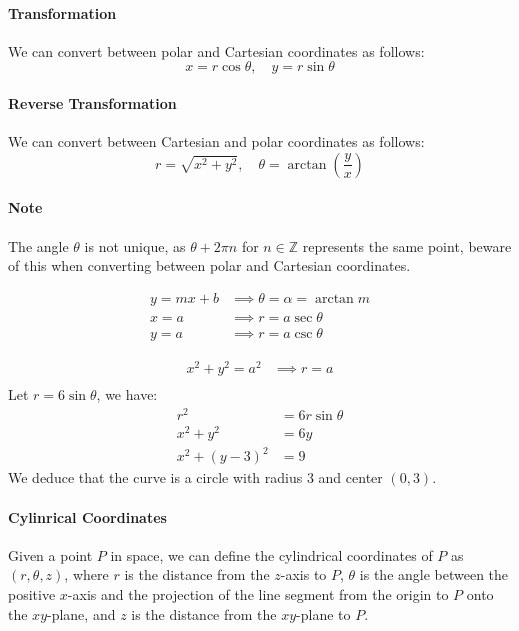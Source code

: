 \documentclass[11pt]{report}
\begin{document}
\paragraph{Transformation} We can convert between polar and Cartesian coordinates as follows:
\begin{equation}
    x = r\cos \theta, \quad y = r\sin \theta
\end{equation}
\paragraph{Reverse Transformation} We can convert between Cartesian and polar coordinates as follows:
\begin{equation}
    r = \sqrt{x^2 + y^2}, \quad \theta = \arctan\left(\frac{y}{x}\right)
\end{equation}
\paragraph{Note} The angle $\theta$ is not unique, as $\theta + 2\pi n$ for $n \in \mathbb{Z}$ represents the same point, beware of this when converting between polar and Cartesian coordinates.
\begin{example}[Lines]
    \begin{align*}
        y = mx + b &\implies \theta = \alpha = \arctan m \\
        x = a &\implies r = a\sec \theta \\
        y = a &\implies r = a\csc \theta
    \end{align*}
\end{example}
\begin{example}[Cirlces]
    \begin{align*}
        x^2 + y^2 = a^2 &\implies r = a \\
    \end{align*}
    Let $r = 6\sin \theta$, we have:
    \begin{align*}
        r^2 &= 6r\sin \theta \\
        x^2 + y^2 &= 6y \\
        x^2 + (y-3)^2 &= 9
    \end{align*}
    We deduce that the curve is a circle with radius $3$ and center $(0,3)$.
\end{example}
\paragraph{Cylinrical Coordinates} Given a point $P$ in space, we can define the cylindrical coordinates of $P$ as $(r, \theta, z)$, where $r$ is the distance from the $z$-axis to $P$, $\theta$ is the angle between the positive $x$-axis and the projection of the line segment from the origin to $P$ onto the $xy$-plane, and $z$ is the distance from the $xy$-plane to $P$.
\end{document}
